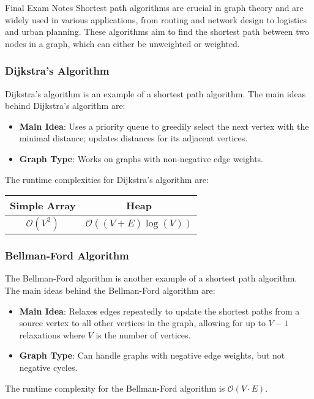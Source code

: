\begin{examnotes}{Final Exam Notes}
    Shortest path algorithms are crucial in graph theory and are widely used in various applications, from routing and network design to logistics and urban planning. These algorithms aim to find the 
    shortest path between two nodes in a graph, which can either be unweighted or weighted.

    \subsubsection*{Dijkstra's Algorithm}

    Dijkstra's algorithm is an example of a shortest path algorithm. The main ideas behind Dijkstra's algorithm are:

    \begin{itemize}
        \item \textbf{Main Idea}: Uses a priority queue to greedily select the next vertex with the minimal distance; updates distances for its adjacent vertices.
        \item \textbf{Graph Type}: Works on graphs with non-negative edge weights.
    \end{itemize}
    The runtime complexities for Dijkstra's algorithm are:

    \begin{center}
        \begin{tabular}[ht]{|c|c|}
            \hline \textbf{Simple Array} & \textbf{Heap} \\ \hline
            $\mathcal{O}(V^{2})$ & $\mathcal{O}((V + E)\log{(V)})$ \\ \hline
        \end{tabular}
    \end{center}

    \subsubsection*{Bellman-Ford Algorithm}

    The Bellman-Ford algorithm is another example of a shortest path algorithm. The main ideas behind the Bellman-Ford algorithm are:

    \begin{itemize}
        \item \textbf{Main Idea}: Relaxes edges repeatedly to update the shortest paths from a source vertex to all other vertices in the graph, allowing for up to $V - 1$ relaxations where $V$ is 
        the number of vertices.
        \item \textbf{Graph Type}: Can handle graphs with negative edge weights, but not negative cycles.
    \end{itemize}
    The runtime complexity for the Bellman-Ford algorithm is $\mathcal{O}(V \cdot E)$.


\end{examnotes}
